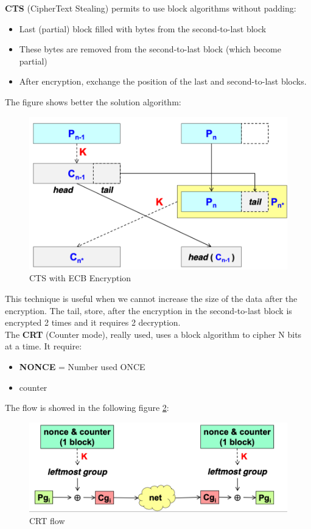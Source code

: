 \documentclass[12pt]{article}
\begin{document}
\textbf{CTS} (CipherText Stealing) permits to use block algorithms without padding:
\begin{itemize}
  \item Last (partial) block filled with bytes from the second-to-last block
  \item These bytes are removed from the second-to-last block (which become partial)
  \item After encryption, exchange the position of the last and second-to-last blocks.
\end{itemize}
 The figure shows better the solution algorithm:
\begin{figure}[H]
   \centering
   \includegraphics[width=\linewidth]{images/cts.png}
   \caption{CTS with ECB Encryption}
   \label{fig:cts}
\end{figure}
This technique is useful when we cannot increase the size of the data after the encryption. The tail, store, after the encryption in the second-to-last block is encrypted 2 times and it requires 2 decryption.\\
The \textbf{CRT} (Counter mode), really used, uses a block algorithm to cipher N bits at a time. It require:
\begin{itemize}
  \item \textbf{NONCE} = Number used ONCE
  \item counter
\end{itemize}
The flow is showed in the following figure \ref{fig:crt}:
\begin{figure}[H]
   \centering
   \includegraphics[width=\linewidth]{images/crt.png}
   \caption{CRT flow}
   \label{fig:crt}
\end{figure}
\end{document}
